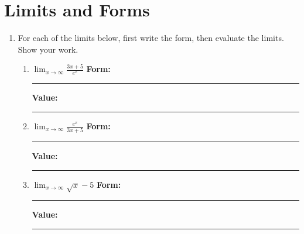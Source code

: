 \documentclass[10pt]{article}
\begin{document}
\pagestyle{otherpages}
\thispagestyle{firstpage}

\section{Limits and Forms}
\begin{enumerate}
\item[1.]\reversemarginpar{} For each of the limits below, first write the form, then evaluate the limits. Show your work.
    \begin{enumerate}


    \item[(a)] $\displaystyle\lim_{x \rightarrow \infty} \frac{3x+5}{e^x}$ \hfill {\bf Form:}\rule[-8pt]{0.5in}{0.4pt} \hfill {\bf Value:}\rule[-8pt]{0.5in}{0.4pt}
        \vfill

    \item[(b)] $\displaystyle\lim_{x \rightarrow \infty} \frac{e^x}{3x+5}$ \hfill {\bf Form:}\rule[-8pt]{0.5in}{0.4pt} \hfill {\bf Value:}\rule[-8pt]{0.5in}{0.4pt}
        \vfill



    \item[(c)] $\displaystyle\lim_{x \rightarrow \infty} \sqrt{x} - 5$ \hfill {\bf Form:}\rule[-8pt]{0.5in}{0.4pt} \hfill {\bf Value:}\rule[-8pt]{0.5in}{0.4pt}
        \vfill


\end{enumerate}
\end{enumerate}
\end{document}
